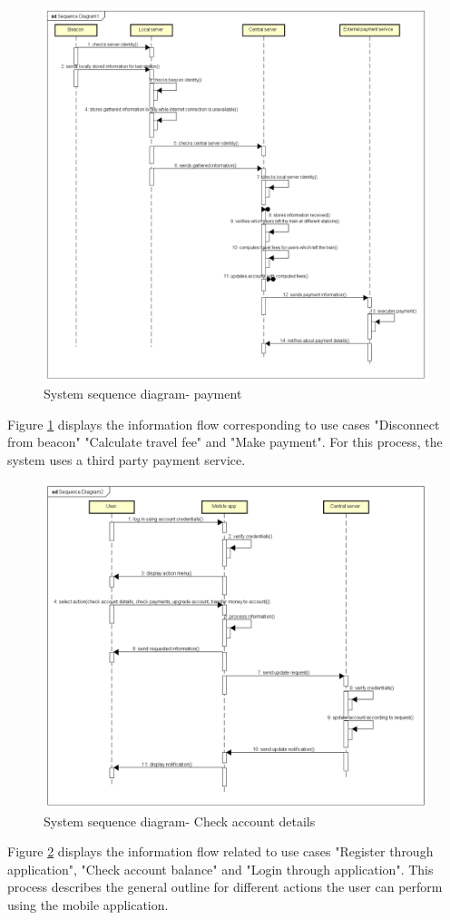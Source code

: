 \begin{figure}[H]
	\centering
	\includegraphics[width=\textwidth]{Pictures/seq_diagram_payment.png}
	\caption{System sequence diagram- payment}
	\label{fig:seqDiagram2}
\end{figure}
Figure \ref{fig:seqDiagram2} displays the information flow corresponding to use cases "Disconnect from beacon" "Calculate travel fee" and "Make payment". For this process, the system uses a third party payment service.

\begin{figure}[H]
	\centering
	\includegraphics[width=\textwidth]{Pictures/seq_diagram_checkAccount.png}
	\caption{System sequence diagram- Check account details}
	\label{fig:seqDiagram3}
\end{figure}
Figure \ref{fig:seqDiagram3} displays the information flow related to use cases "Register through application", "Check account balance" and "Login through application". This process describes the general outline for different actions the user can perform using the mobile application.


